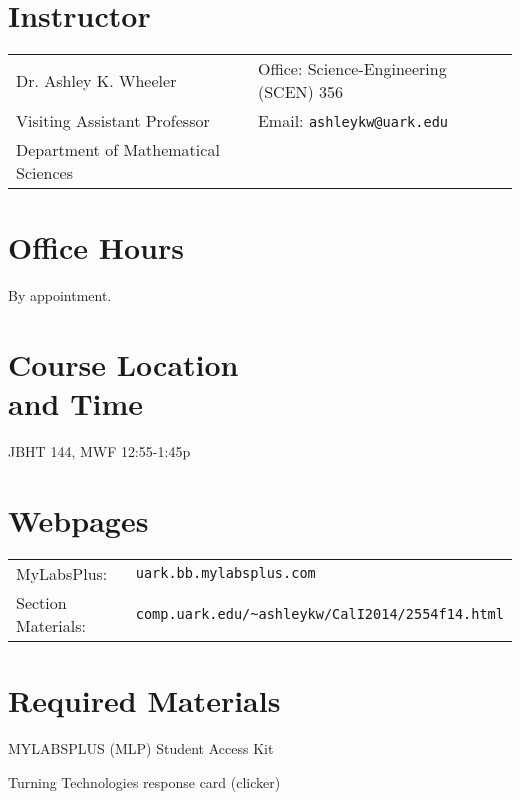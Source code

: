 \documentclass[margin,line,pifont,palatino,courier]{res}
\newenvironment{list1}{
  \begin{list}{\ding{113}}{%
      \setlength{\itemsep}{0in}
      \setlength{\parsep}{0in} \setlength{\parskip}{0in}
      \setlength{\topsep}{0in} \setlength{\partopsep}{0in}
      \setlength{\leftmargin}{0.17in}}}{\end{list}}
\begin{document}

\begin{resume}

\section{\sc Instructor}

\vspace{.05in}
\begin{tabular}{@{}p{2.6in}p{4in}}
Dr. Ashley K. Wheeler & Office: Science-Engineering (SCEN) 356 \\
Visiting Assistant Professor & Email: \verb+ashleykw@uark.edu+ \\
Department of Mathematical Sciences & 
\end{tabular}

\section{\sc Office Hours}
By appointment.

\section{\sc Course Location \\ and Time} JBHT 144, MWF 12:55-1:45p

\section{\sc Webpages}
\begin{tabular}{@{}l l}
MyLabsPlus: & \verb+uark.bb.mylabsplus.com+ \\
Section Materials: & \verb+comp.uark.edu/~ashleykw/CalI2014/2554f14.html+ 
\end{tabular}

\section{\sc Required Materials}
\begin{list1}
\item MYLABSPLUS (MLP) Student Access Kit 
\item Turning Technologies response card (clicker)
\end{list1}


\end{resume}
\end{document}
